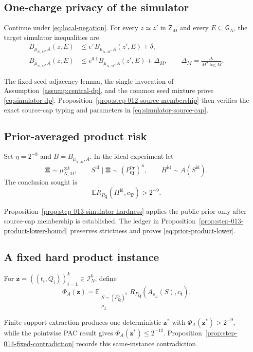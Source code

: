 \subsection{One-charge privacy of the simulator}\label{app:step-012}
Continue under \eqref{eq:local-negation}.  For every
$z\simeq z'$ in $\mathsf Z_M$ and every $E\subseteq\mathsf G_N$, the
target simulator inequalities are
\begin{align}
B_{\mu_{N,M},A}(z,E)
&\le e^\varepsilon B_{\mu_{N,M},A}(z',E)+\delta,
\tag{4}\label{eq:simulator-dp}\\
B_{\mu_{N,M},A}(z,E)
&\le e^{0.1}B_{\mu_{N,M},A}(z',E)+\Delta_M,
\qquad
\Delta_M=\frac{d_*}{M^2\log M}.
\tag{6}\label{eq:simulator-source-cap}
\end{align}

The fixed-seed adjacency lemma, the single invocation of
Assumption~\ref{assump:central-dp}, and the common seed mixture prove
\eqref{eq:simulator-dp}.  Proposition~\ref{prop:step-012-source-membership}
then verifies the exact source-cap typing and parameters in
\eqref{eq:simulator-source-cap}.

\subsection{Prior-averaged product risk}\label{app:step-013}
Set $\eta=2^{-8}$ and $B=B_{\mu_{N,M},A}$.  In the ideal experiment let
\begin{equation}
\boldsymbol\Xi\sim\mu_{N,M}^{\otimes k},
\qquad
S^{\mathrm{id}}\mid\boldsymbol\Xi
\sim(P_{\boldsymbol Q}^{c_{\boldsymbol T}})^n,
\qquad
H^{\mathrm{id}}\sim A(S^{\mathrm{id}}).
\tag{3}\label{eq:product-lower-experiment}
\end{equation}
The conclusion sought is
\begin{equation}
\mathbb E R_{P_{\boldsymbol Q}}(H^{\mathrm{id}},c_{\boldsymbol T})
>2^{-9}.
\tag{4}\label{eq:prior-product-lower}
\end{equation}

Proposition~\ref{prop:step-013-simulator-hardness} applies the public prior
only after source-cap membership is established.  The ledger in
Proposition~\ref{prop:step-013-product-lower-bound} preserves strictness and
proves \eqref{eq:prior-product-lower}.

\subsection{A fixed hard product instance}\label{app:step-014}
For $\boldsymbol z=((t_i,Q_i))_{i=1}^k\in\mathcal I_N^k$, define
\begin{equation}
\Phi_A(\boldsymbol z)
=\mathbb E_{\substack{S\sim(P_{\boldsymbol Q}^{c_{\boldsymbol t}})^n\\
\rho_A}}
R_{P_{\boldsymbol Q}}(A_{\rho_A}(S),c_{\boldsymbol t}).
\tag{3}\label{eq:fixed-instance-functional}
\end{equation}

Finite-support extraction produces one deterministic $\boldsymbol z^*$
with $\Phi_A(\boldsymbol z^*)>2^{-9}$, while the pointwise PAC result gives
$\Phi_A(\boldsymbol z^*)\le2^{-12}$.  Proposition~\ref{prop:step-014-fixed-contradiction}
records this same-instance contradiction.

